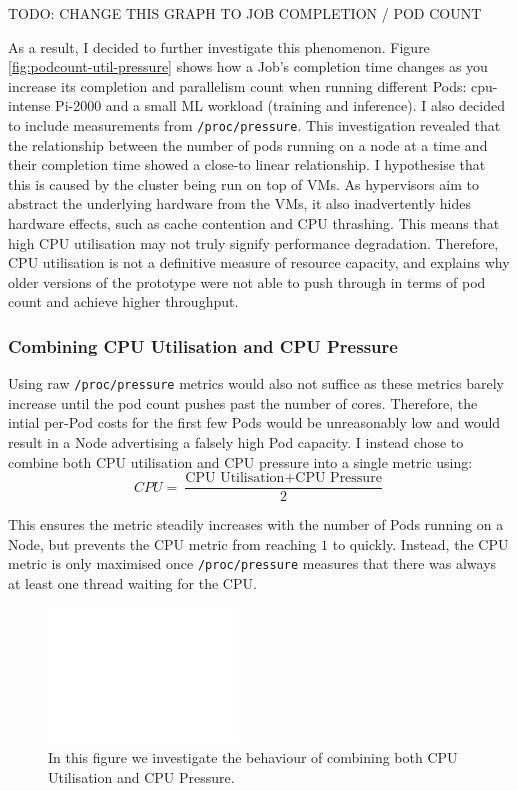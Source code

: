 TODO: CHANGE THIS GRAPH TO JOB COMPLETION / POD COUNT

As a result, I decided to further investigate this phenomenon. Figure
\ref{fig:podcount-util-pressure} shows how a Job's completion time changes as you
increase its completion and parallelism count when running different Pods:
cpu-intense Pi-2000 and a small ML workload (training and inference). I also
decided to include measurements from \verb|/proc/pressure|. This investigation
revealed that the relationship between the number of pods running on
a node at a time and their completion time showed a close-to linear
relationship. I hypothesise that this is caused by the cluster being run on top
of VMs. As hypervisors aim to abstract the underlying hardware from the VMs, it
also inadvertently hides hardware effects, such as cache contention and CPU
thrashing. This means that high  CPU utilisation may not truly signify
performance degradation. Therefore, CPU utilisation is not a definitive measure
of resource capacity, and explains why older versions of the  prototype were not
able to push through in terms of pod count and achieve higher throughput.

\subsubsection{Combining CPU Utilisation and CPU Pressure}
Using raw \verb|/proc/pressure| metrics would also not suffice as these metrics
barely increase until the pod count pushes past the number of cores. Therefore,
the intial per-Pod costs for the first few Pods would be unreasonably low and
would result in a Node advertising a falsely high Pod capacity. I instead chose
to combine both CPU utilisation and CPU pressure into a single metric using:
\[ CPU = \frac{\text{CPU Utilisation} + \text{CPU Pressure}}{2} \]

This ensures the metric steadily increases with the number of Pods running on a
Node, but prevents the CPU metric from reaching $1$ to quickly. Instead, the CPU
metric is only maximised once \verb|/proc/pressure| measures that there was
always at least one thread waiting for the CPU.

\begin{figure}[H]
    \centering
    \includegraphics[width=0.45\textwidth]{images/blank.pdf}
    \caption{In this figure we investigate the behaviour of combining both CPU
    Utilisation and CPU Pressure.}
    \label{fig:combine-cpu-pressure}
\end{figure}

